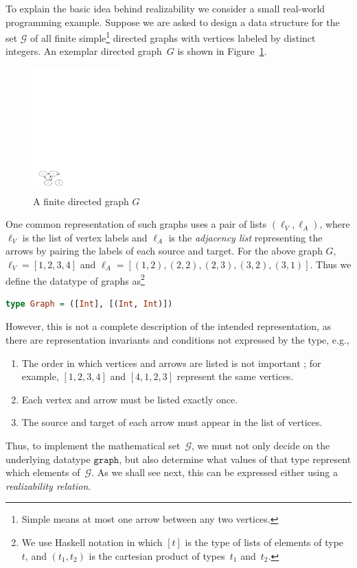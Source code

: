 To explain the basic idea behind realizability we consider a small
real-world programming example. Suppose we are asked to design a data
structure for the set $\mathcal{G}$ of all finite
simple\footnote{Simple means at most one arrow between any two
  vertices.} directed graphs with vertices labeled by distinct
integers. An exemplar directed graph~$G$ is shown in
Figure~\ref{fig:digraph}.
%
\begin{figure}[htp]
  \centering
  \includegraphics[width=0.3\textwidth]{digraph}
  \caption{A finite directed graph $G$}
  \label{fig:digraph}
\end{figure}
%
One common representation of such graphs uses a pair of lists
$(\ell_V, \ell_A)$, where $\ell_V$ is the list of vertex labels and
$\ell_A$ is the \emph{adjacency list} representing the arrows by
pairing the labels of each source and target. For the above graph $G$,
$\ell_V = [1, 2, 3, 4]$ and $\ell_A = [(1,2), (2,2), (2,3), (3,2),
(3,1)]$.
%
Thus we define the datatype of graphs as\footnote{We use Haskell
  notation in which $[t]$ is the type of lists of elements of
  type~$t$, and $(t_1, t_2)$ is the cartesian product of types~$t_1$
  and~$t_2$.}
%
\begin{lstlisting}[language=Haskell]
type Graph = ([Int], [(Int, Int)])
\end{lstlisting}
%
However, this is not a complete description of the intended
representation, as there are representation invariants and conditions
not expressed by the type, e.g.,
%
\begin{enumerate}
\item The order in which vertices and arrows are listed is not
  important%
; for example, $[1,2,3,4]$ and $[4,1,2,3]$ represent the same vertices.
\item Each vertex and arrow must be listed exactly once.
\item The source and target of each arrow must appear in the list of vertices.
\end{enumerate}
%
Thus, to implement the mathematical set~$\mathcal{G}$, we must not
only decide on the underlying datatype $\mathtt{graph}$, but also
determine what values of that type represent which elements
of~$\mathcal{G}$. As we shall see next, this can be expressed either
using a \emph{realizability relation}.



